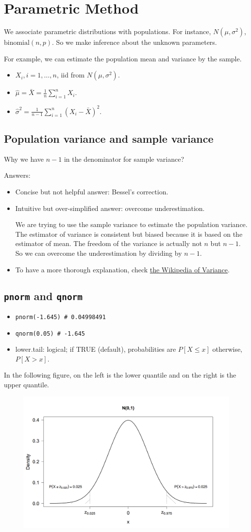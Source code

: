 \section{Parametric Method}
We associate parametric distributions with populations. For instance, $N(\mu, \sigma^2)$, $\text{binomial}(n, p)$. So we make inference about the unknown parameters.

For example, we can estimate the population mean and variance by the sample.
\begin{itemize}
	\item $X_i, i = 1, \dots, n$, iid from $N(\mu, \sigma^2)$.
	\item $\hat{\mu} = \bar{X} = \frac{1}{n} \sum_{i=1}^{n}X_i$.
	\item $\hat{\sigma}^2 = \frac{1}{n-1} \sum_{i=1}^{n}(X_i - \bar{X})^2$.
\end{itemize}

\subsection{Population variance and sample variance}
Why we have $n-1$ in the denominator for sample variance?

Answers:
\begin{itemize}
	\item Concise but not helpful answer: Bessel's correction.
	\item Intuitive but over-simplified answer: overcome underestimation.
	
	We are trying to use the sample variance to estimate the population variance. The estimator of variance is consistent but biased because it is based on the estimator of mean. The freedom of the variance is actually not $n$ but $n-1$. So we can overcome the underestimation by dividing by $n-1$.
	\item To have a more thorough explanation, check \href{https://en.wikipedia.org/wiki/Variance#Population_variance_and_sample_variance}{the Wikipedia of Variance}.
\end{itemize}

\subsection{\texttt{pnorm} and \texttt{qnorm}}
\begin{itemize}
	\item \texttt{pnorm(-1.645) \# 0.04998491}
	\item \texttt{qnorm(0.05) \# -1.645}
	\item lower.tail: logical; if TRUE (default), probabilities are $P[X \le x]$ otherwise,
$P[X > x]$.
\end{itemize}

In the following figure, on the left is the lower quantile and on the right is the upper quantile.

\begin{figure}[H]
	\centering
	\includegraphics[width=0.5\linewidth]{fig/norm-distribution}
	\caption{}
	\label{fig:norm-distribution}
\end{figure}
